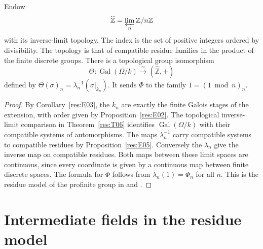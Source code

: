 \begin{theorem}
\label{res:E06}
Endow
\[
    \widehat{\mathbb Z}
      =\varprojlim_{n}\mathbb Z/n\mathbb Z
\]
with its inverse-limit topology. The index is the set of positive
integers ordered by divisibility. The topology is that of compatible
residue families in the product of the finite discrete groups.
There is a topological group isomorphism
\[
         \Theta:\operatorname{Gal}(\Omega/k)
                          \xrightarrow{\ \sim\ }(\widehat{\mathbb Z},+)
\]
defined by \(\Theta(\sigma)_n=\lambda_n^{-1}(\sigma|_{k_n})\).
It sends \(\Phi\) to the family \(1=(1\bmod n)_n\).
\end{theorem}
\begin{proof}
By Corollary~\ref{res:E03}, the \(k_n\) are exactly the finite
Galois stages of the extension, with order given by
Proposition~\ref{res:E02}. The topological inverse-limit comparison
in Theorem~\ref{res:T06} identifies \(\operatorname{Gal}(\Omega/k)\)
with their compatible systems of automorphisms. The maps
\(\lambda_n^{-1}\) carry compatible systems to compatible residues
by Proposition~\ref{res:E05}. Conversely the \(\lambda_n\) give the
inverse map on compatible residues. Both maps between these limit
spaces are continuous, since every coordinate is given by a continuous
map between finite discrete spaces. The formula for \(\Phi\) follows
from \(\lambda_n(1)=\Phi_n\) for all \(n\).
This is the residue model of the profinite group in
\cite[Example 7.17]{milne} and \cite[Example 2.11.2]{rz}.
\end{proof}

\section{Intermediate fields in the residue model}

